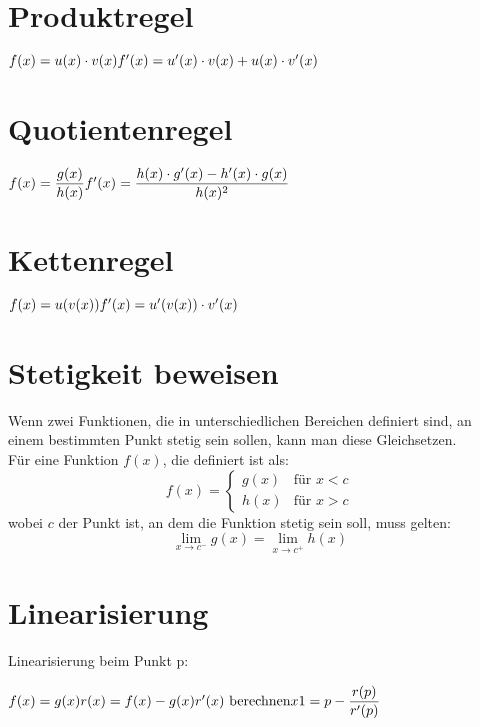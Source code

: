\documentclass{article}
\begin{document}
\begin{multicols}{2}
	
\section*{Produktregel}

\(
f(x) = u(x) \cdot v(x) \\
f'(x) = u'(x) \cdot v(x) + u(x) \cdot v'(x)
\)

\section*{Quotientenregel}

\(
f(x) = \dfrac{g(x)}{h(x)} \\
f'(x) = \dfrac{h(x) \cdot g'(x) - h'(x) \cdot g(x)}{h(x)^2}
\)

\section*{Kettenregel}

\(
f(x) = u(v(x)) \\
f'(x) = u'(v(x)) \cdot v'(x)
\)

\section*{Stetigkeit beweisen}

\begin{minipage}{0.4\textwidth}
	Wenn zwei Funktionen, die in unterschiedlichen Bereichen definiert sind, an einem bestimmten Punkt stetig sein sollen, kann man diese Gleichsetzen. \\
	
	Für eine Funktion \( f(x) \), die definiert ist als:
	\[
	f(x) = 
	\begin{cases} 
		g(x) & \text{für } x < c \\
		h(x) & \text{für } x > c 
	\end{cases}
	\]
	wobei \( c \) der Punkt ist, an dem die Funktion stetig sein soll, muss gelten:
	\[
	\lim_{{x \to c^-}} g(x) = \lim_{{x \to c^+}} h(x)
	\]
\end{minipage}

\section*{Linearisierung}

Linearisierung beim Punkt p:

\( \\
f(x) = g(x) \\
r(x) = f(x) - g(x) \\
r'(x) \text{ berechnen} \\
x1 = p - \dfrac{r(p)}{r'(p)}
\)


\end{multicols}
\end{document}
